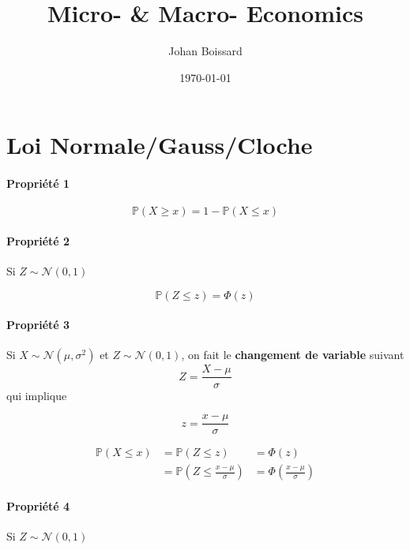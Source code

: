 \documentclass[a4paper,titlepage] {scrartcl}
\author{Johan Boissard}
\date{\today}
\title{Micro- \& Macro- Economics}
\begin{document}

\section{Loi Normale/Gauss/Cloche}

\paragraph{Propriété 1} %
\label{par:propriété_1}
\begin{equation}
	\mathbb P(X\geq x) = 1 -\mathbb P(X\leq x)
\end{equation}


\paragraph{Propriété 2} %
\label{par:propriété_2}
Si $Z\sim \mathcal N(0,1)$

\begin{equation}
	\mathbb P(Z\leq z) = \Phi(z)
\end{equation}

\paragraph{Propriété 3} %
\label{par:propriété_3}
Si $X\sim \mathcal N(\mu, \sigma^2)$ et $Z\sim \mathcal N(0, 1)$, on fait le \textbf{changement de variable} suivant
\begin{equation}
	Z = \frac{X-\mu}{\sigma}
\end{equation}
qui implique

\begin{equation}
	z = \frac{x-\mu}{\sigma}
\end{equation}

\begin{eqnarray}
	\mathbb P(X\leq x) &= \mathbb P(Z\leq z) &= \Phi\left(z\right)\nonumber\\
	 &= \mathbb P\left(Z\leq \frac{x-\mu}{\sigma}\right) &=\Phi\left(\frac{x-\mu}{\sigma}\right) 
\end{eqnarray}

\paragraph{Propriété 4} %
\label{par:propriété_4}
Si $Z\sim\mathcal N(0,1)$
\end{document}
